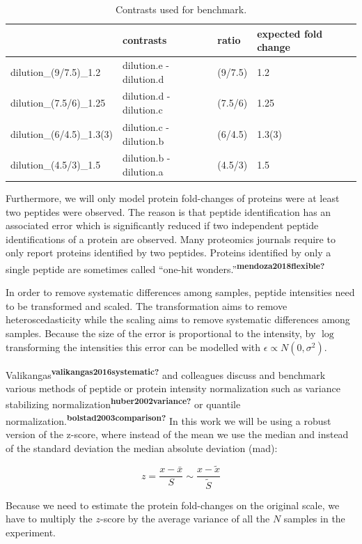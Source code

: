 \documentclass[journal=jacsat,manuscript=article]{achemso}
\begin{document}
\begin{table}

\caption{\label{tab:usedContrasts}Contrasts used for benchmark.}
\centering
\begin{tabular}[t]{l|l|l|l}
\hline
  & contrasts & ratio & expected fold change\\
\hline
dilution\_(9/7.5)\_1.2 & dilution.e - dilution.d & (9/7.5) & 1.2\\
\hline
dilution\_(7.5/6)\_1.25 & dilution.d - dilution.c & (7.5/6) & 1.25\\
\hline
dilution\_(6/4.5)\_1.3(3) & dilution.c - dilution.b & (6/4.5) & 1.3(3)\\
\hline
dilution\_(4.5/3)\_1.5 & dilution.b - dilution.a & (4.5/3) & 1.5\\
\hline
\end{tabular}
\end{table}

Furthermore, we will only model protein fold-changes of proteins were at
least two peptides were observed. The reason is that peptide
identification has an associated error which is significantly reduced if
two independent peptide identifications of a protein are observed. Many
proteomics journals require to only report proteins identified by two
peptides. Proteins identified by only a single peptide are sometimes
called ``one-hit
wonders.''\textsuperscript{\textbf{mendoza2018flexible?}}

In order to remove systematic differences among samples, peptide
intensities need to be transformed and scaled. The transformation aims
to remove heteroscedasticity while the scaling aims to remove systematic
differences among samples. Because the size of the error is proportional
to the intensity, by \(\log\) transforming the intensities this error
can be modelled with \(\epsilon \propto N(0, \sigma^2)\).

Valikangas\textsuperscript{\textbf{valikangas2016systematic?}} and
colleagues discuss and benchmark various methods of peptide or protein
intensity normalization such as variance stabilizing
normalization\textsuperscript{\textbf{huber2002variance?}} or quantile
normalization.\textsuperscript{\textbf{bolstad2003comparison?}} In this
work we will be using a robust version of the z-score, where instead of
the mean we use the median and instead of the standard deviation the
median absolute deviation (mad):

\[
z = \frac{x - \bar{x}}{S} \sim \frac{x - \tilde{x}}{\tilde{S}}
\]

Because we need to estimate the protein fold-changes on the original
scale, we have to multiply the \(z\)-score by the average variance of
all the \(N\) samples in the experiment.
\end{document}
